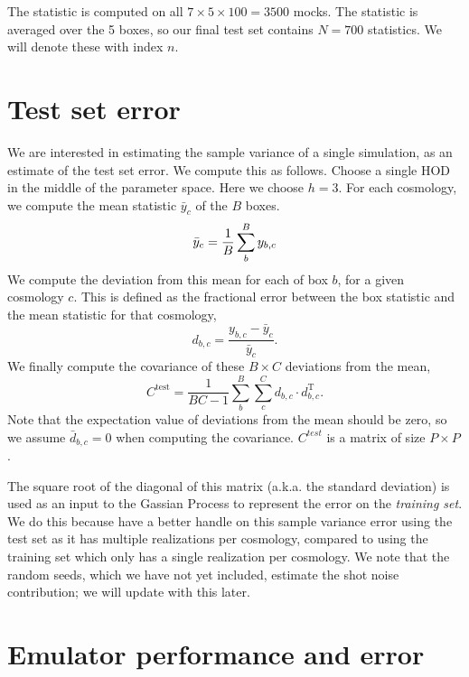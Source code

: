 \documentclass[12pt]{article}
\newcommand{\T}{^{\mathrm{T}}}
\newcommand{\cov}[1]{C^\text{#1}}
\begin{document}
The statistic is computed on all $7 \times 5 \times 100 = 3500$ mocks. 
The statistic is averaged over the 5 boxes, so our final test set contains $N=700$ statistics. 
We will denote these with index $n$.

\section{Test set error}

We are interested in estimating the sample variance of a single simulation, as an estimate of the test set error.
We compute this as follows. 
Choose a single HOD in the middle of the parameter space.
Here we choose $h=3$.
For each cosmology, we compute the mean statistic $\bar{y}_{c}$ of the $B$ boxes.
\begin{equation}
    \bar{y}_{c} = \frac{1}{B} \sum_b^B {y_{b,c}} \\
\end{equation}
We compute the deviation from this mean for each of box $b$, for a given cosmology $c$. 
This is defined as the fractional error between the box statistic and the mean statistic for that cosmology,
\begin{equation}
    d_{b,c} = \frac{ {y_{b,c} - \bar{y}_{c}} } {\bar{y}_{c}}.
\end{equation}
We finally compute the covariance of these $B \times C$ deviations from the mean,
\begin{equation}
    \cov{test} = \frac{1}{BC-1} \sum_{b}^B \sum_{c}^C d_{b,c} \cdot d_{b,c}\T.
\end{equation}
Note that the expectation value of deviations from the mean should be zero, so we assume $\bar{d}_{b,c}=0$ when computing the covariance. $C^{test}$ is a matrix of size $P \times P$.

The square root of the diagonal of this matrix (a.k.a. the standard deviation) is used as an input to the Gassian Process to represent the error on the \emph{training set}. %
We do this because have a better handle on this sample variance error using the test set as it has multiple realizations per cosmology, compared to using the training set which only has a single realization per cosmology.
We note that the random seeds, which we have not yet included, estimate the shot noise contribution; we will update with this later.


\section{Emulator performance and error}
\end{document}
